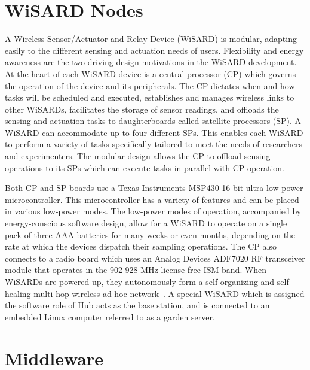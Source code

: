 \section{WiSARD Nodes}
A Wireless Sensor/Actuator and Relay Device (WiSARD) is  modular, adapting easily to the different sensing and actuation needs of users. Flexibility and energy awareness are the two driving design motivations in the WiSARD development. At the heart of each WiSARD device is a central processor (CP) which governs the operation of the device and its peripherals. The CP dictates when and how tasks will be scheduled and executed, establishes and manages wireless links to other WiSARDs, facilitates the storage of sensor readings, and offloads the sensing and actuation tasks to daughterboards called satellite processors (SP). A WiSARD can accommodate up to four different SPs. This enables each WiSARD to perform a variety of tasks specifically tailored to meet the needs of researchers and experimenters. The modular design allows the CP to offload sensing operations to its SPs which can execute tasks in parallel with CP operation. 

Both CP and SP boards use a Texas Instruments MSP430 16-bit ultra-low-power microcontroller. This microcontroller has a variety of features and can be placed in various low-power modes. The low-power modes of operation, accompanied by energy-conscious software design, allow for a WiSARD to operate on a single pack of three AAA batteries for many weeks or even months, depending on the rate at which the devices dispatch their sampling operations. The CP also connects to a radio board which uses an Analog Devices ADF7020 RF transceiver module that operates in the 902-928 MHz license-free ISM band.  When WiSARDs are powered up, they autonomously form a self-organizing and self-healing multi-hop wireless ad-hoc network~\cite{Flikkema}. A special WiSARD which is assigned the software role of Hub acts as the base station, and is connected to an embedded Linux computer referred to as a garden server. 

\section{Middleware}

